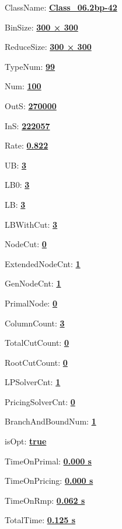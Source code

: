 \documentclass[11pt]{article}
\begin{document}
\pagestyle{empty}


ClassName: \underline{\textbf{Class_06.2bp-42}}
\par
BinSize: \underline{\textbf{300 × 300}}
\par
ReduceSize: \underline{\textbf{300 × 300}}
\par
TypeNum: \underline{\textbf{99}}
\par
Num: \underline{\textbf{100}}
\par
OutS: \underline{\textbf{270000}}
\par
InS: \underline{\textbf{222057}}
\par
Rate: \underline{\textbf{0.822}}
\par
UB: \underline{\textbf{3}}
\par
LB0: \underline{\textbf{3}}
\par
LB: \underline{\textbf{3}}
\par
LBWithCut: \underline{\textbf{3}}
\par
NodeCut: \underline{\textbf{0}}
\par
ExtendedNodeCnt: \underline{\textbf{1}}
\par
GenNodeCnt: \underline{\textbf{1}}
\par
PrimalNode: \underline{\textbf{0}}
\par
ColumnCount: \underline{\textbf{3}}
\par
TotalCutCount: \underline{\textbf{0}}
\par
RootCutCount: \underline{\textbf{0}}
\par
LPSolverCnt: \underline{\textbf{1}}
\par
PricingSolverCnt: \underline{\textbf{0}}
\par
BranchAndBoundNum: \underline{\textbf{1}}
\par
isOpt: \underline{\textbf{true}}
\par
TimeOnPrimal: \underline{\textbf{0.000 s}}
\par
TimeOnPricing: \underline{\textbf{0.000 s}}
\par
TimeOnRmp: \underline{\textbf{0.062 s}}
\par
TotalTime: \underline{\textbf{0.125 s}}
\par
\newpage
\end{document}
